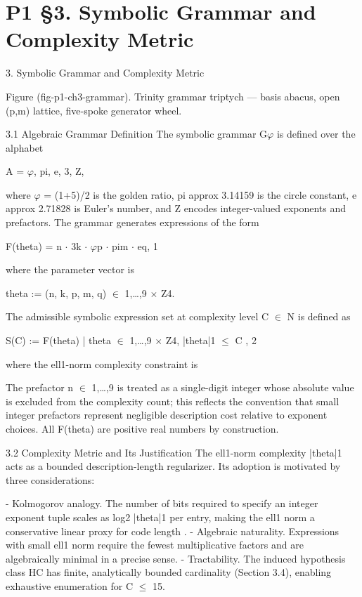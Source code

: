 
\section{P1 §3. Symbolic Grammar and Complexity Metric}

3. Symbolic Grammar and Complexity Metric

          Figure (fig-p1-ch3-grammar). Trinity grammar triptych --- basis abacus, open (p,m) lattice,
                                        five-spoke generator wheel.

  3.1 Algebraic Grammar Definition
  The symbolic grammar G$\varphi$ is defined over the alphabet

  A = {$\varphi$, pi, e, 3, Z},

  where $\varphi$ = (1+5)/2 is the golden ratio, pi approx 3.14159 is the circle constant, e approx
  2.71828 is Euler's number, and Z encodes integer-valued exponents and prefactors. The
  grammar generates expressions of the form

  F(theta) = n $\cdot$ 3k $\cdot$ $\varphi$p $\cdot$ pim $\cdot$ eq, 1

  where the parameter vector is

  theta := (n, k, p, m, q) $\in$ {1,…,9} $\times$ Z4.

  The admissible symbolic expression set at complexity level C $\in$ N is defined as

  S(C) := { F(theta) | theta $\in$ {1,…,9} $\times$ Z4, |theta|1 $\leq$ C }, 2

  where the ell1-norm complexity constraint is

  The prefactor n $\in$ {1,…,9} is treated as a single-digit integer whose absolute value is
  excluded from the complexity count; this reflects the convention that small integer
  prefactors represent negligible description cost relative to exponent choices. All
  F(theta) are positive real numbers by construction.

  3.2 Complexity Metric and Its Justification
  The ell1-norm complexity |theta|1 acts as a bounded description-length regularizer. Its
  adoption is motivated by three considerations:

  - Kolmogorov analogy. The number of bits required to specify an integer exponent tuple
  scales as log2 |theta|1 per entry, making the ell1 norm a conservative linear proxy for
  code length \citep{barron1998,chaitin1987}.
  - Algebraic naturality. Expressions with small ell1 norm require the fewest
  multiplicative factors and are algebraically minimal in a precise sense.
  - Tractability. The induced hypothesis class HC has finite, analytically bounded
  cardinality (Section 3.4), enabling exhaustive enumeration for C $\leq$ 15.

